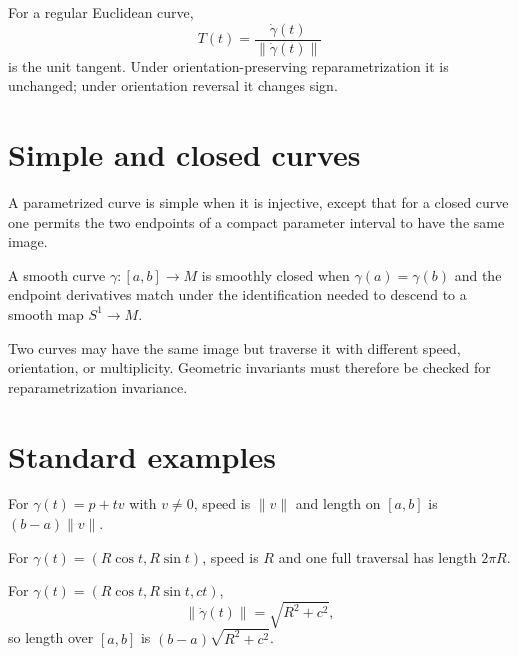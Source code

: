 \begin{definition}\label{def:vii12-unit-tangent}
For a regular Euclidean curve,
\[
T(t)=\frac{\dot\gamma(t)}{\|\dot\gamma(t)\|}
\]
is the unit tangent. Under orientation-preserving reparametrization it is unchanged; under orientation reversal it changes sign.
\end{definition}

\section{Simple and closed curves}
\begin{definition}\label{def:vii12-simple}
A parametrized curve is simple when it is injective, except that for a closed curve one permits the two endpoints of a compact parameter interval to have the same image.
\end{definition}

\begin{definition}\label{def:vii12-closed}
A smooth curve $\gamma:[a,b]\to M$ is smoothly closed when $\gamma(a)=\gamma(b)$ and the endpoint derivatives match under the identification needed to descend to a smooth map $S^1\to M$.
\end{definition}

\begin{warning}\label{warning:vii12-image-param}
Two curves may have the same image but traverse it with different speed, orientation, or multiplicity. Geometric invariants must therefore be checked for reparametrization invariance.
\end{warning}

\section{Standard examples}
\begin{example}[Line]\label{ex:vii12-line}
For $\gamma(t)=p+tv$ with $v\ne0$, speed is $\|v\|$ and length on $[a,b]$ is $(b-a)\|v\|$.
\end{example}

\begin{example}[Circle]\label{ex:vii12-circle}
For $\gamma(t)=(R\cos t,R\sin t)$, speed is $R$ and one full traversal has length $2\pi R$.
\end{example}

\begin{example}[Helix]\label{ex:vii12-helix}
For $\gamma(t)=(R\cos t,R\sin t,ct)$,
\[
\|\dot\gamma(t)\|=\sqrt{R^2+c^2},
\]
so length over $[a,b]$ is $(b-a)\sqrt{R^2+c^2}$.
\end{example}

